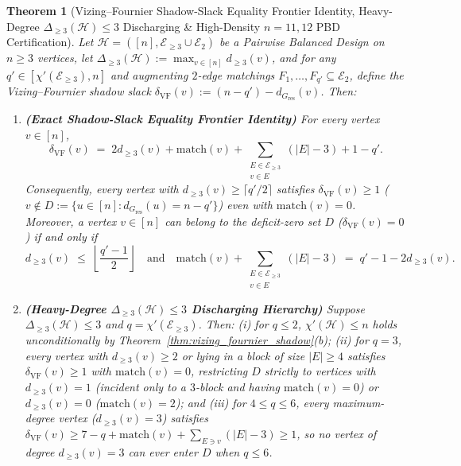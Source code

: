 \documentclass[11pt,reqno]{amsart}
\newtheorem{theorem}{Theorem}[section]
\theoremstyle{definition}
\theoremstyle{remark}
\begin{document}
\begin{theorem}[Vizing--Fournier Shadow-Slack Equality Frontier Identity, Heavy-Degree $\Delta_{\ge 3}(\mathcal{H}) \le 3$ Discharging \& High-Density $n = 11, 12$ PBD Certification]\label{thm:shadow_slack_frontier}
Let $\mathcal{H} = ([n], \mathcal{E}_{\ge 3} \cup \mathcal{E}_2)$ be a Pairwise Balanced Design on $n \ge 3$ vertices, let $\Delta_{\ge 3}(\mathcal{H}) := \max_{v \in [n]} d_{\ge 3}(v)$, and for any $q' \in [\chi'(\mathcal{E}_{\ge 3}), n]$ and augmenting $2$-edge matchings $F_1, \dots, F_{q'} \subseteq \mathcal{E}_2$, define the \emph{Vizing--Fournier shadow slack} $\delta_{\mathrm{VF}}(v) := (n - q') - d_{G_{\mathrm{res}}}(v)$. Then:
\begin{enumerate}
  \item[\textup{(a)}] \textbf{(Exact Shadow-Slack Equality Frontier Identity)} For every vertex $v \in [n]$,
  \begin{equation}\label{eq:shadow_slack_identity}
    \delta_{\mathrm{VF}}(v) \;=\; 2 d_{\ge 3}(v) + \mathrm{match}(v) + \sum_{\substack{E \in \mathcal{E}_{\ge 3} \\ v \in E}} (|E| - 3) + 1 - q'.
  \end{equation}
  Consequently, every vertex with $d_{\ge 3}(v) \ge \lceil q' / 2 \rceil$ satisfies $\delta_{\mathrm{VF}}(v) \ge 1$ ($v \notin D := \{u \in [n] : d_{G_{\mathrm{res}}}(u) = n - q'\}$) even with $\mathrm{match}(v) = 0$. Moreover, a vertex $v \in [n]$ can belong to the deficit-zero set $D$ ($\delta_{\mathrm{VF}}(v) = 0$) if and only if
  \begin{equation}\label{eq:deficit_zero_frontier}
    d_{\ge 3}(v) \;\le\; \left\lfloor \frac{q' - 1}{2} \right\rfloor \quad \text{and} \quad \mathrm{match}(v) + \sum_{\substack{E \in \mathcal{E}_{\ge 3} \\ v \in E}} (|E| - 3) \;=\; q' - 1 - 2 d_{\ge 3}(v).
  \end{equation}
  \item[\textup{(b)}] \textbf{(Heavy-Degree $\Delta_{\ge 3}(\mathcal{H}) \le 3$ Discharging Hierarchy)} Suppose $\Delta_{\ge 3}(\mathcal{H}) \le 3$ and $q = \chi'(\mathcal{E}_{\ge 3})$. Then: (i) for $q \le 2$, $\chi'(\mathcal{H}) \le n$ holds unconditionally by Theorem~\ref{thm:vizing_fournier_shadow}(b); (ii) for $q = 3$, every vertex with $d_{\ge 3}(v) \ge 2$ or lying in a block of size $|E| \ge 4$ satisfies $\delta_{\mathrm{VF}}(v) \ge 1$ with $\mathrm{match}(v) = 0$, restricting $D$ strictly to vertices with $d_{\ge 3}(v) = 1$ (incident only to a $3$-block and having $\mathrm{match}(v) = 0$) or $d_{\ge 3}(v) = 0$ ($\mathrm{match}(v) = 2$); and (iii) for $4 \le q \le 6$, every maximum-degree vertex ($d_{\ge 3}(v) = 3$) satisfies $\delta_{\mathrm{VF}}(v) \ge 7 - q + \mathrm{match}(v) + \sum_{E \ni v}(|E| - 3) \ge 1$, so no vertex of degree $d_{\ge 3}(v) = 3$ can ever enter $D$ when $q \le 6$.

\end{enumerate}
\end{theorem}
\end{document}
